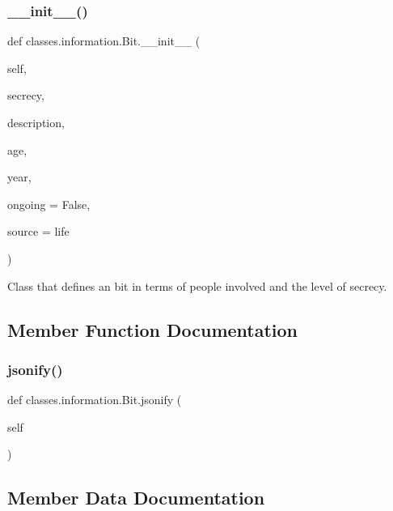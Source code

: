 \subsubsection{\texorpdfstring{\+\_\+\+\_\+init\+\_\+\+\_\+()}{\_\_init\_\_()}}
{\footnotesize\ttfamily def classes.\+information.\+Bit.\+\_\+\+\_\+init\+\_\+\+\_\+ (\begin{DoxyParamCaption}\item[{}]{self,  }\item[{}]{secrecy,  }\item[{}]{description,  }\item[{}]{age,  }\item[{}]{year,  }\item[{}]{ongoing = {\ttfamily False},  }\item[{}]{source = {\ttfamily \textquotesingle{}life\textquotesingle{}} }\end{DoxyParamCaption})}

\begin{DoxyVerb}Class that defines an bit in terms of people involved and the 
level of secrecy. 
\end{DoxyVerb}
 

\subsection{Member Function Documentation}
\mbox{\label{classclasses_1_1information_1_1Bit_aecc5ee342c3f9e4a0a50e0ccf968612d}} 
\subsubsection{\texorpdfstring{jsonify()}{jsonify()}}
{\footnotesize\ttfamily def classes.\+information.\+Bit.\+jsonify (\begin{DoxyParamCaption}\item[{}]{self }\end{DoxyParamCaption})}



\subsection{Member Data Documentation}
\mbox{\label{classclasses_1_1information_1_1Bit_ae2b2e2283b963c5b1265a43207b950e6}} 
